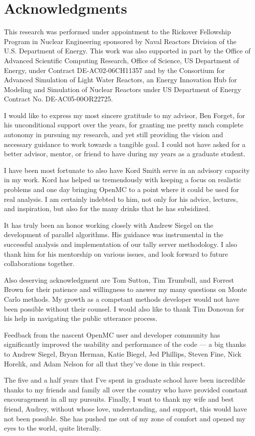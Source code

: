 \section*{Acknowledgments}

This research was performed under appointment to the Rickover Fellowship Program
in Nuclear Engineering sponsored by Naval Reactors Division of the
U.S. Department of Energy. This work was also supported in part by the Office of
Advanced Scientific Computing Research, Office of Science, US Department of
Energy, under Contract DE-AC02-06CH11357 and by the Consortium for Advanced
Simulation of Light Water Reactors, an Energy Innovation Hub for Modeling and
Simulation of Nuclear Reactors under US Department of Energy Contract
No. DE-AC05-00OR22725.

I would like to express my most sincere gratitude to my advisor, Ben Forget, for
his unconditional support over the years, for granting me pretty much complete
autonomy in pursuing my research, and yet still providing the vision and
necessary guidance to work towards a tangible goal. I could not have asked for a
better advisor, mentor, or friend to have during my years as a graduate student.

I have been most fortunate to also have Kord Smith serve in an advisory capacity
in my work. Kord has helped us tremendously with keeping a focus on realistic
problems and one day bringing OpenMC to a point where it could be used for real
analysis. I am certainly indebted to him, not only for his advice, lectures, and
inspiration, but also for the many drinks that he has subsidized.

It has truly been an honor working closely with Andrew Siegel on the development
of parallel algorithms. His guidance was instrumental in the successful analysis
and implementation of our tally server methodology. I also thank him for his
mentorship on various issues, and look forward to future collaborations
together.

Also deserving acknowledgment are Tom Sutton, Tim Trumbull, and Forrest Brown
for their patience and willingness to answer my many questions on Monte Carlo
methods. My growth as a competant methods developer would not have been possible
without their counsel. I would also like to thank Tim Donovan for his help in
navigating the public utterance process.

Feedback from the nascent OpenMC user and developer community has significantly
improved the usability and performance of the code --- a big thanks to Andrew
Siegel, Bryan Herman, Katie Biegel, Jed Phillips, Steven Fine, Nick Horelik, and
Adam Nelson for all that they've done in this respect.

The five and a half years that I've spent in graduate school have been
incredible thanks to my friends and family all over the country who have
provided constant encouragement in all my pursuits. Finally, I want to thank my
wife and best friend, Audrey, without whose love, understanding, and support,
this would have not been possible. She has pushed me out of my zone of comfort
and opened my eyes to the world, quite literally.
